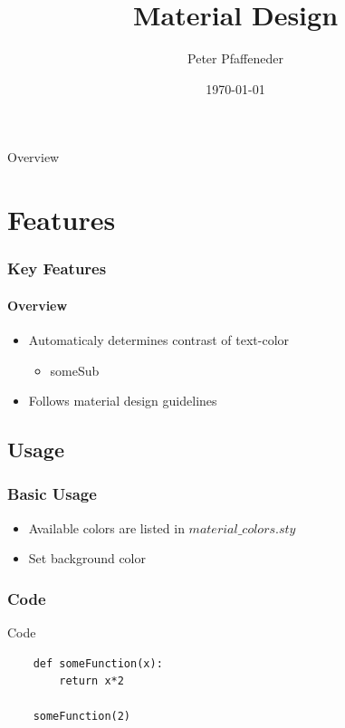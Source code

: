 \documentclass{beamer}
\title{Material Design}
\date{\today}
\author{Peter Pfaffeneder}
\institute[Technische Mathematik]
\begin{document}

\begin{frame}
	\titlepage
\end{frame}

{
	\begin{frame}{Overview}
		\tableofcontents
	\end{frame}
}


\section{Features}
\begin{frame}
	\frametitle{Key Features}
	\framesubtitle{Overview}

	\begin{itemize}
		\item Automaticaly determines contrast of text-color
		\begin{itemize}
			\item someSub
		\end{itemize}
		\item Follows material design guidelines
	\end{itemize}
\end{frame}


\subsection{Usage}
\begin{frame}
	\frametitle{Basic Usage}
	\begin{itemize}
		\item Available colors are listed in $material\_colors.sty$
		\item Set background color
	\end{itemize}
\end{frame}

\subsubsection{Code}
\begin{frame}[fragile=singleslide]{Code}
	\begin{lstlisting}
	def someFunction(x):
		return x*2

	someFunction(2)
	\end{lstlisting}
\end{frame}
\end{document}
